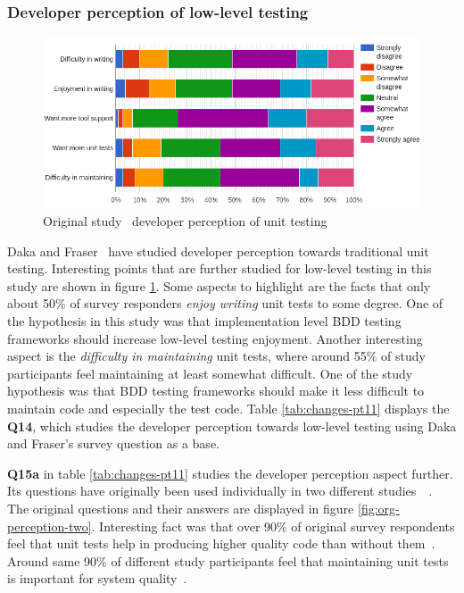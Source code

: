 \subsubsection{Developer perception of low-level testing}
    \begin{figure}[ht]
      \begin{center}
        \includegraphics[width=14.7cm]{images/perception-org.png}
        \caption{Original study~\cite{daka2014survey} developer perception of unit testing}
        \label{fig:org-perception}
      \end{center}
    \end{figure}

Daka and Fraser~\cite{daka2014survey} have studied developer perception towards traditional unit testing. Interesting
points that are further studied for low-level testing in this study are shown in figure \ref{fig:org-perception}. Some
aspects to highlight are the facts that only about 50\% of survey responders \textit{enjoy writing} unit tests to some degree.
One of the hypothesis in this study was that implementation level BDD testing frameworks should increase low-level testing enjoyment.
Another interesting aspect is the \textit{difficulty in maintaining} unit tests, where around 55\% of study participants
feel maintaining at least somewhat difficult. One of the study hypothesis was that BDD testing frameworks should
make it less difficult to maintain code and especially the test code. Table \ref{tab:changes-pt11} displays the \textbf{Q14}, which studies
the developer perception towards low-level testing using Daka and Fraser's survey question as a base.

\textbf{Q15a} in table \ref{tab:changes-pt11} studies the developer perception aspect further. Its questions have originally
been used individually in two different studies~\cite{williams2009effectiveness}~\cite{li2016automatically}. The original
questions and their answers are displayed in figure \ref{fig:org-perception-two}. Interesting fact was that over 90\% of
original survey respondents feel that unit tests help in producing higher quality code than without them~\cite{williams2009effectiveness}.
Around same 90\% of different study participants feel that maintaining unit tests is important for system quality~\cite{li2016automatically}.


